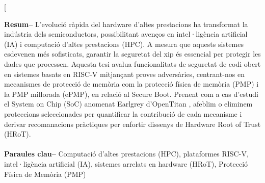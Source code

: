 \documentclass[10pt,a4paper,twocolumn,twoside]{article}
\begin{document}
\twocolumn[\begin{@twocolumnfalse}


\maketitle

\thispagestyle{primerapagina}
\begin{center}
\parbox{0.915\textwidth}
{\sffamily
\textbf{Resum--} L'evolució ràpida del hardware d'altes prestacions ha transformat la indústria dels semiconductors, possibilitant avenços en intel·ligència artificial (IA) i computació d'altes prestacions (HPC). A mesura que aquests sistemes esdevenen més sofisticats, garantir la seguretat del xip és essencial per protegir les dades que processen. Aquesta tesi avalua funcionalitats de seguretat de codi obert en sistemes basats en RISC-V mitjançant proves adversàries, centrant-nos en mecanismes de protecció de memòria com la protecció física de memòria (PMP) i la PMP millorada (ePMP), en relació al Secure Boot. Prenent com a cas d'estudi el System on Chip (SoC) anomenat Earlgrey d'OpenTitan \cite{opentitan} \cite{meza2023} \cite{musa2024}, afeblim o eliminem proteccions seleccionades per quantificar la contribució de cada mecanisme i derivar recomanacions pràctiques per enfortir dissenys de Hardware Root of Trust (HRoT).
\\
\\
\textbf{Paraules clau-- } Computació d'altes prestacions (HPC), plataformes RISC-V, intel·ligència artificial (IA), sistemes arrelats en hardware (HRoT), Protecció Física de Memòria (PMP)

}
\end{center}
\end{@twocolumnfalse}
\end{document}
